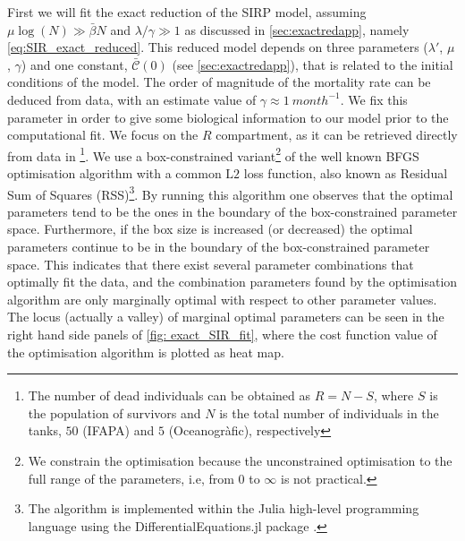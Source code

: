 First we will fit the exact reduction of the SIRP model, assuming
$\mu\log(N)\gg\bar{\beta}N$ and $\lambda/\gamma\gg 1$ as discussed in
\cref{sec:exactredapp}, namely \cref{eq:SIR_exact_reduced}.
This reduced model depends on three parameters ($\lambda'$, $\mu$,
$\gamma$) and one constant, $\bar{\mathcal{C}}(0)$ (see
\cref{sec:exactredapp}), that is related to the initial conditions of the
model. The order of magnitude
of the mortality rate can be deduced from data, with an estimate value of
$\gamma\approx\SI{1}{month^{-1}}$. We fix this parameter in order to give some
biological information to our model prior to the computational fit. We focus on
the $R$ compartment, as it can be retrieved directly from data in
\cite{March}\footnote{The number of dead individuals can be obtained as
    $R=N-S$, where $S$ is the population of survivors and $N$ is the total
    number
    of individuals in the tanks,
    $50$ (IFAPA) and $5$ (Oceanogr\`afic), respectively}.
We use a box-constrained variant\footnote{We constrain the optimisation
    because the unconstrained optimisation to the full range of the parameters,
    i.e, from $0$ to $\infty$ is not practical.} of the well known BFGS
optimisation algorithm \cite{BFGS} with a common $\textrm{L}2$ loss function,
also known as Residual Sum of Squares (RSS)\footnote{The algorithm is
    implemented within the Julia high-level programming language \cite{julia}
    using the DifferentialEquations.jl package
    \cite{DifferentialEquations.jl}.}.
By running this algorithm one observes that the optimal parameters tend to be
the ones in the boundary of the box-constrained parameter space.
Furthermore, if the box size is increased (or decreased) the optimal
parameters continue to be in the boundary of the box-constrained parameter
space.
This indicates that there exist several parameter combinations that
optimally fit the data, and the combination parameters found by the
optimisation algorithm are only marginally optimal with respect to other
parameter values. The locus (actually a valley) of marginal optimal parameters
can be seen in the right hand side panels of \cref{fig: exact_SIR_fit}, where
the cost function value of the optimisation algorithm is plotted as heat map.

